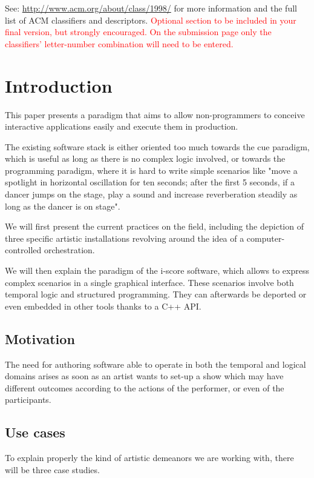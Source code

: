 \documentclass{sigchi}
\begin{document}

See: \url{http://www.acm.org/about/class/1998/}
for more information and the full list of ACM classifiers
and descriptors. \newline
\textcolor{red}{Optional section to be included in your final version, 
but strongly encouraged. On the submission page only the classifiers’ 
letter-number combination will need to be entered.}

\section{Introduction}
This paper presents a paradigm that aims to allow non-programmers 
to conceive interactive applications easily and execute them in production.

The existing software stack is either oriented too much towards the 
cue paradigm, which is useful as long as there is no complex logic involved, 
or towards the programming paradigm, where it is hard to write simple scenarios 
like "move a spotlight in horizontal oscillation for ten seconds; after the first 5 
seconds, if a dancer jumps on the stage, play a sound and increase reverberation steadily as long as the dancer is on stage".

We will first present the current practices on the field, including the depiction of three specific artistic installations revolving around the idea of a computer-controlled orchestration.

We will then explain the paradigm of the i-score software, which allows to express complex scenarios in a single graphical interface. These scenarios involve both temporal logic and structured programming. They can afterwards be deported or even embedded in other tools thanks to a C++ API. 

\subsection{Motivation}
The need for authoring software able to operate in both the temporal and logical domains arises as soon as an artist wants to set-up a show which may have different outcomes according to the actions of the performer, or even of the participants.

\subsection{Use cases}
To explain properly the kind of artistic demeanors we are working with, there will be three case studies.
\end{document}
